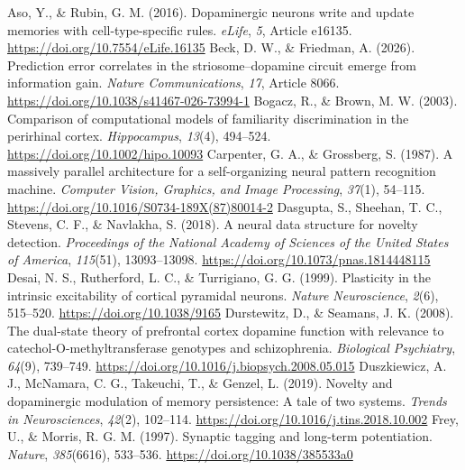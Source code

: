 \documentclass[11pt,a4paper]{article}
\begin{document}
\renewcommand{\refname}{References}
\begin{thebibliography}{}\small
\setlength{\itemindent}{-1.5em}\setlength{\leftmargin}{1.5em}
 Aso, Y., \& Rubin, G. M. (2016). Dopaminergic neurons write and update memories with cell-type-specific rules. \emph{eLife}, \emph{5}, Article e16135. \url{https://doi.org/10.7554/eLife.16135}
 Beck, D. W., \& Friedman, A. (2026). Prediction error correlates in the striosome--dopamine circuit emerge from information gain. \emph{Nature Communications}, \emph{17}, Article 8066. \url{https://doi.org/10.1038/s41467-026-73994-1}
 Bogacz, R., \& Brown, M. W. (2003). Comparison of computational models of familiarity discrimination in the perirhinal cortex. \emph{Hippocampus}, \emph{13}(4), 494--524. \url{https://doi.org/10.1002/hipo.10093}
 Carpenter, G. A., \& Grossberg, S. (1987). A massively parallel architecture for a self-organizing neural pattern recognition machine. \emph{Computer Vision, Graphics, and Image Processing}, \emph{37}(1), 54--115. \url{https://doi.org/10.1016/S0734-189X(87)80014-2}
 Dasgupta, S., Sheehan, T. C., Stevens, C. F., \& Navlakha, S. (2018). A neural data structure for novelty detection. \emph{Proceedings of the National Academy of Sciences of the United States of America}, \emph{115}(51), 13093--13098. \url{https://doi.org/10.1073/pnas.1814448115}
 Desai, N. S., Rutherford, L. C., \& Turrigiano, G. G. (1999). Plasticity in the intrinsic excitability of cortical pyramidal neurons. \emph{Nature Neuroscience}, \emph{2}(6), 515--520. \url{https://doi.org/10.1038/9165}
 Durstewitz, D., \& Seamans, J. K. (2008). The dual-state theory of prefrontal cortex dopamine function with relevance to catechol-O-methyltransferase genotypes and schizophrenia. \emph{Biological Psychiatry}, \emph{64}(9), 739--749. \url{https://doi.org/10.1016/j.biopsych.2008.05.015}
 Duszkiewicz, A. J., McNamara, C. G., Takeuchi, T., \& Genzel, L. (2019). Novelty and dopaminergic modulation of memory persistence: A tale of two systems. \emph{Trends in Neurosciences}, \emph{42}(2), 102--114. \url{https://doi.org/10.1016/j.tins.2018.10.002}
 Frey, U., \& Morris, R. G. M. (1997). Synaptic tagging and long-term potentiation. \emph{Nature}, \emph{385}(6616), 533--536. \url{https://doi.org/10.1038/385533a0}

\end{thebibliography}
\end{document}
